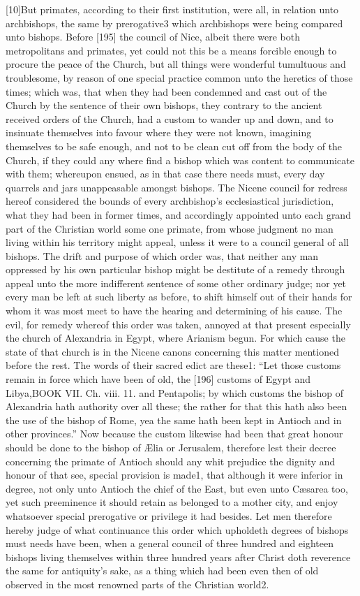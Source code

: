 [10]But primates, according to their first institution, were all, in relation unto archbishops, the same by prerogative3 which archbishops were being compared unto bishops. Before [195] the council of Nice, albeit there were both metropolitans and primates, yet could not this be a means forcible enough to procure the peace of the Church, but all things were wonderful tumultuous and troublesome, by reason of one special practice common unto the heretics of those times; which was, that when they had been condemned and cast out of the Church by the sentence of their own bishops, they contrary to the ancient received orders of the Church, had a custom to wander up and down, and to insinuate themselves into favour where they were not known, imagining themselves to be safe enough, and not to be clean cut off from the body of the Church, if they could any where find a bishop which was content to communicate with them; whereupon ensued, as in that case there needs must, every day quarrels and jars unappeasable amongst bishops. The Nicene council for redress hereof considered the bounds of every archbishop’s ecclesiastical jurisdiction, what they had been in former times, and accordingly appointed unto each grand part of the Christian world some one primate, from whose judgment no man living within his territory might appeal, unless it were to a council general of all bishops. The drift and purpose of which order was, that neither any man oppressed by his own particular bishop might be destitute of a remedy through appeal unto the more indifferent sentence of some other ordinary judge; nor yet every man be left at such liberty as before, to shift himself out of their hands for whom it was most meet to have the hearing and determining of his cause. The evil, for remedy whereof this order was taken, annoyed at that present especially the church of Alexandria in Egypt, where Arianism begun. For which cause the state of that church is in the Nicene canons concerning this matter mentioned before the rest. The words of their sacred edict are these1: “Let those customs remain in force which have been of old, the [196] customs of Egypt and Libya,BOOK VII. Ch. viii. 11. and Pentapolis; by which customs the bishop of Alexandria hath authority over all these; the rather for that this hath also been the use of the bishop of Rome, yea the same hath been kept in Antioch and in other provinces.” Now because the custom likewise had been that great honour should be done to the bishop of Ælia or Jerusalem, therefore lest their decree concerning the primate of Antioch should any whit prejudice the dignity and honour of that see, special provision is made1, that although it were inferior in degree, not only unto Antioch the chief of the East, but even unto Cæsarea too, yet such preeminence it should retain as belonged to a mother city, and enjoy whatsoever special prerogative or privilege it had besides. Let men therefore hereby judge of what continuance this order which upholdeth degrees of bishops must needs have been, when a general council of three hundred and eighteen bishops living themselves within three hundred years after Christ doth reverence the same for antiquity’s sake, as a thing which had been even then of old observed in the most renowned parts of the Christian world2.

